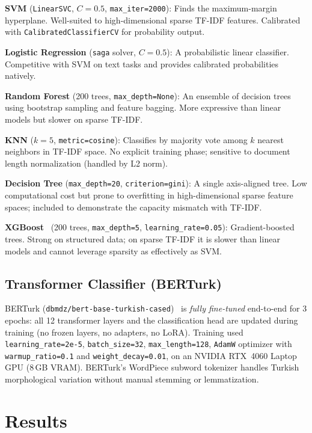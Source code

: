\documentclass[conference]{IEEEtran}
\begin{document}
\textbf{SVM} (\texttt{LinearSVC}, $C=0.5$, \texttt{max\_iter=2000}): Finds the
maximum-margin hyperplane. Well-suited to high-dimensional sparse TF-IDF features.
Calibrated with \texttt{CalibratedClassifierCV} for probability output.

\textbf{Logistic Regression} (\texttt{saga} solver, $C=0.5$): A probabilistic linear
classifier. Competitive with SVM on text tasks and provides calibrated probabilities
natively.

\textbf{Random Forest} (200 trees, \texttt{max\_depth=None}): An ensemble of decision
trees using bootstrap sampling and feature bagging. More expressive than linear
models but slower on sparse TF-IDF.

\textbf{KNN} ($k=5$, \texttt{metric=cosine}): Classifies by majority vote among
$k$ nearest neighbors in TF-IDF space. No explicit training phase; sensitive to
document length normalization (handled by L2 norm).

\textbf{Decision Tree} (\texttt{max\_depth=20}, \texttt{criterion=gini}): A single
axis-aligned tree. Low computational cost but prone to overfitting in high-dimensional
sparse feature spaces; included to demonstrate the capacity mismatch with TF-IDF.

\textbf{XGBoost}~\cite{b_xgboost} (200 trees, \texttt{max\_depth=5}, \texttt{learning\_rate=0.05}):
Gradient-boosted trees. Strong on structured data; on sparse TF-IDF it is
slower than linear models and cannot leverage sparsity as effectively as SVM.

\subsection{Transformer Classifier (BERTurk)}

BERTurk (\texttt{dbmdz/bert-base-turkish-cased})~\cite{b7} is \textit{fully fine-tuned}
end-to-end for 3 epochs: all 12 transformer layers and the classification head are
updated during training (no frozen layers, no adapters, no LoRA). Training used
\texttt{learning\_rate=2e-5}, \texttt{batch\_size=32}, \texttt{max\_length=128},
\texttt{AdamW} optimizer with \texttt{warmup\_ratio=0.1} and \texttt{weight\_decay=0.01},
on an NVIDIA RTX~4060 Laptop GPU (8\,GB VRAM). BERTurk's WordPiece subword tokenizer
handles Turkish morphological variation without manual stemming or lemmatization.

\section{Results}
\label{sec:results}
\end{document}

